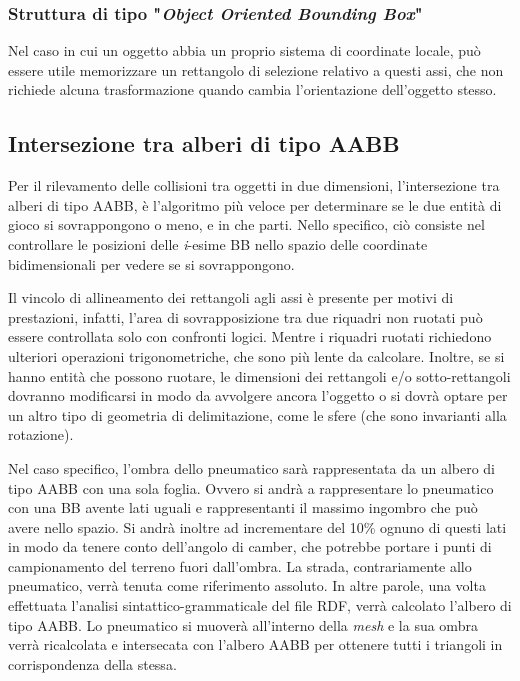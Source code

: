 \subsubsection{Struttura di tipo "\textit{Object Oriented Bounding Box}"}
Nel caso in cui un oggetto abbia un proprio sistema di coordinate locale, può essere utile memorizzare un rettangolo di selezione relativo a questi assi, che non richiede alcuna trasformazione quando cambia l'orientazione dell'oggetto stesso.

\subsection{Intersezione tra alberi di tipo AABB}
Per il rilevamento delle collisioni tra oggetti in due dimensioni, l'intersezione tra alberi di tipo \ac{AABB}, è l'algoritmo più veloce per determinare se le due entità di gioco si sovrappongono o meno, e in che parti. Nello specifico, ciò consiste nel controllare le posizioni delle \textit{i}-esime \ac{BB} nello spazio delle coordinate bidimensionali per vedere se si sovrappongono.

Il vincolo di allineamento dei rettangoli agli assi è presente per motivi di prestazioni, infatti, l'area di sovrapposizione tra due riquadri non ruotati può essere controllata solo con confronti logici. Mentre i riquadri ruotati richiedono ulteriori operazioni trigonometriche, che sono più lente da calcolare. Inoltre, se si hanno entità che possono ruotare, le dimensioni dei rettangoli e/o sotto-rettangoli dovranno modificarsi in modo da avvolgere ancora l'oggetto o si dovrà optare per un altro tipo di geometria di delimitazione, come le sfere (che sono invarianti alla rotazione).

Nel caso specifico, l'ombra dello pneumatico sarà rappresentata da un albero di tipo \ac{AABB} con una sola foglia. Ovvero si andrà a rappresentare lo pneumatico con una \ac{BB} avente lati uguali e rappresentanti il massimo ingombro che può avere nello spazio. Si andrà inoltre ad incrementare del 10\% ognuno di questi lati in modo da tenere conto dell'angolo di camber, che potrebbe portare i punti di campionamento del terreno fuori dall'ombra. La strada, contrariamente allo pneumatico, verrà tenuta come riferimento assoluto. In altre parole, una volta effettuata l'analisi sintattico-grammaticale del file \ac{RDF}, verrà calcolato l'albero di tipo \ac{AABB}. Lo pneumatico si muoverà all'interno della \textit{mesh} e la sua ombra verrà ricalcolata e intersecata con l'albero \ac{AABB} per ottenere tutti i triangoli in corrispondenza della stessa.

